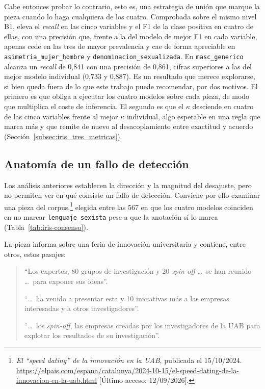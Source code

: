 Cabe entonces probar lo contrario, esto es, una estrategia de unión que marque la pieza
cuando lo haga cualquiera de los cuatro. Comprobada sobre el mismo nivel B1, eleva el
\textit{recall} en las cinco variables y el F1 de la clase positiva en cuatro de ellas, con una
precisión que, frente a la del modelo de mejor F1 en cada variable, apenas cede en las
tres de mayor prevalencia y cae de forma apreciable en \texttt{asimetria\_mujer\_hombre} y \texttt{denominacion\_sexualizada}. En \texttt{masc\_generico} alcanza un \textit{recall} de
0,841 con una precisión de 0,861, cifras superiores a las del mejor modelo individual
(0,733 y 0,887). Es un resultado que merece explorarse, si bien queda fuera de lo que
este trabajo puede recomendar, por dos motivos. El primero es que obliga a ejecutar los
cuatro modelos sobre cada pieza, de modo que multiplica el coste de inferencia. El
segundo es que el $\kappa$ desciende en cuatro de las cinco variables frente al mejor
$\kappa$ individual, algo esperable
en una regla que marca más y que remite de nuevo al desacoplamiento entre exactitud y
acuerdo (Sección~\ref{subsec:iris_tres_metricas}).

\subsection{Anatomía de un fallo de detección}
\label{subsec:iris_caso}

Los análisis anteriores establecen la dirección y la magnitud del desajuste, pero no
permiten ver en qué consiste un fallo de detección. Conviene por ello examinar una pieza del corpus,\footnote{\textit{El ``speed dating''
de la innovación en la UAB}, publicada el 15/10/2024.
\url{https://elpais.com/espana/catalunya/2024-10-15/el-speed-dating-de-la-innovacion-en-la-uab.html}
[Último acceso: 12/09/2026].} elegida entre
las 567 en que los cuatro modelos coinciden en no marcar
\texttt{lenguaje\_sexista} pese a que la anotación sí lo marca
(Tabla~\ref{tab:iris-consenso}).

La pieza informa sobre una feria de innovación universitaria y contiene, entre
otros, estos pasajes:

\begin{quote}
\small
``Los expertos, 80 grupos de investigación y 20 \textit{spin-off} \ldots\ se han
reunido \ldots\ para exponer sus ideas''.

``\ldots\ ha venido a presentar esta y 10 iniciativas más a las empresas
interesadas y a otros investigadores''.

``\ldots\ los \textit{spin-off}, las empresas creadas por los investigadores de la
UAB para explotar los resultados de su investigación''.
\end{quote}

